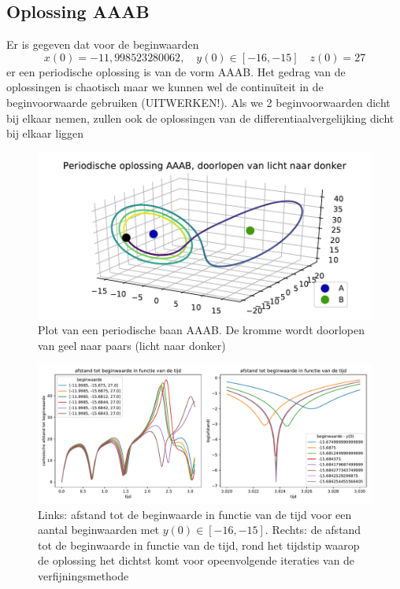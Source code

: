 \documentclass[12pt, a4paper]{article}
\theoremstyle{definition}
\begin{document}
\subsection{Oplossing AAAB}
Er is gegeven dat voor de beginwaarden
$$x(0) =−11, 998 523 280 062, \quad y(0) \in [-16, -15] \quad   z(0) = 27$$
er een periodische oplossing is van de vorm AAAB. Het gedrag van de oplossingen is chaotisch maar we kunnen wel de continuïteit in de beginvoorwaarde gebruiken (UITWERKEN!). Als we 2 beginvoorwaarden dicht bij elkaar nemen, zullen ook de oplossingen van de differentiaalvergelijking dicht bij elkaar liggen

\begin{figure}[h]
    \centering
    \includegraphics[width=0.9\linewidth]{periodische_baan_AAAB_opdracht4.pdf}
    \caption{Plot van een periodische baan AAAB. De kromme wordt doorlopen van geel naar paars (licht naar donker)}
    \label{fig: AAAB}
\end{figure}

\begin{figure}[h]
    \centering
    \includegraphics[width=\linewidth]{afstand_beginwaarde_opdracht4.pdf}
    \caption{Links: afstand tot de beginwaarde in functie van de tijd voor een aantal beginwaarden met $y(0) \in [-16, -15]$. Rechts: de afstand tot de beginwaarde in functie van de tijd, rond het tijdstip waarop de oplossing het dichtst komt voor opeenvolgende iteraties van de verfijningsmethode}
    \label{fig: afstand}
\end{figure}
\end{document}
